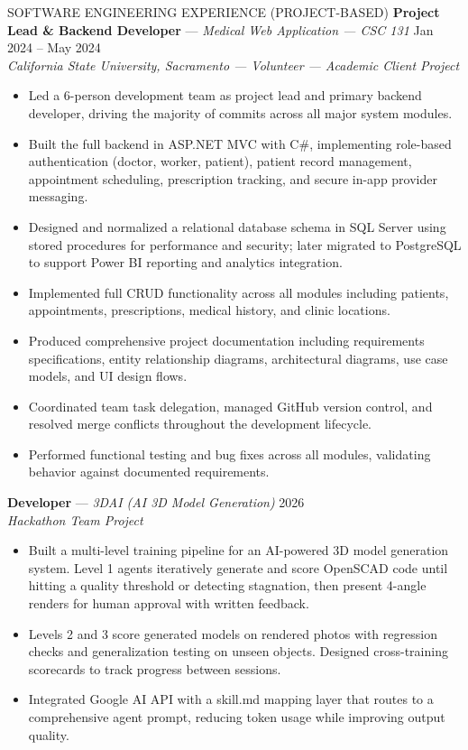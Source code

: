 \documentclass{resume}
\begin{document}
\begin{rSection}{SOFTWARE ENGINEERING EXPERIENCE (PROJECT-BASED)}
\textbf{Project Lead \& Backend Developer} --- \textit{Medical Web Application --- CSC 131} \hfill Jan 2024 -- May 2024 \\
\textit{California State University, Sacramento --- Volunteer --- Academic Client Project}
\begin{itemize}
    \item Led a 6-person development team as project lead and primary backend developer, driving the majority of commits across all major system modules.
    \item Built the full backend in ASP.NET MVC with C\#, implementing role-based authentication (doctor, worker, patient), patient record management, appointment scheduling, prescription tracking, and secure in-app provider messaging.
    \item Designed and normalized a relational database schema in SQL Server using stored procedures for performance and security; later migrated to PostgreSQL to support Power BI reporting and analytics integration.
    \item Implemented full CRUD functionality across all modules including patients, appointments, prescriptions, medical history, and clinic locations.
    \item Produced comprehensive project documentation including requirements specifications, entity relationship diagrams, architectural diagrams, use case models, and UI design flows.
    \item Coordinated team task delegation, managed GitHub version control, and resolved merge conflicts throughout the development lifecycle.
    \item Performed functional testing and bug fixes across all modules, validating behavior against documented requirements.
\end{itemize}

\textbf{Developer} --- \textit{3DAI (AI 3D Model Generation)} \hfill 2026 \\
\textit{Hackathon Team Project}
\begin{itemize}
    \item Built a multi-level training pipeline for an AI-powered 3D model generation system. Level 1 agents iteratively generate and score OpenSCAD code until hitting a quality threshold or detecting stagnation, then present 4-angle renders for human approval with written feedback.
    \item Levels 2 and 3 score generated models on rendered photos with regression checks and generalization testing on unseen objects. Designed cross-training scorecards to track progress between sessions.
    \item Integrated Google AI API with a skill.md mapping layer that routes to a comprehensive agent prompt, reducing token usage while improving output quality.
\end{itemize}


\end{rSection}
\end{document}
